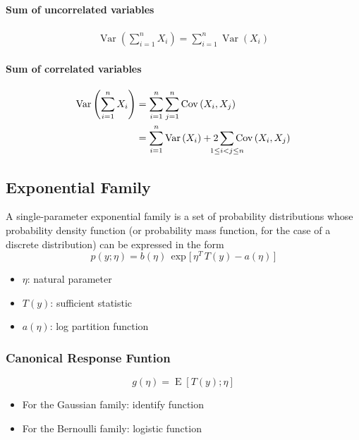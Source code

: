 \documentclass[8pt, a4paper, landscape, includeheadfoot]{extarticle}
\begin{document}
\begin{multicols*}{4}
	\paragraph{Sum of uncorrelated variables}

	\begin{align*}
		\operatorname{Var}\left(\sum_{i=1}^n X_i\right) = \sum_{i=1}^n \operatorname{Var}(X_i)
	\end{align*}

	\paragraph{Sum of correlated variables}
	\begin{align*}
		\operatorname{Var}\left(\sum_{i=1}^n X_i\right) & = \sum_{i=1}^n \sum_{j=1}^n \operatorname{Cov}\left(X_i, X_j\right)                                                                    \\
		                                                & = \sum_{i=1}^n \operatorname{Var}\left(X_i\right) + 2\hskip-10pt\sum_{1\le i<j\le n}\hskip-10pt\operatorname{Cov}\left(X_i, X_j\right)
	\end{align*}

	\subsection{Exponential Family}
	A single-parameter exponential family is a set of probability distributions
	whose probability density function (or probability mass function, for the case of a discrete distribution) can be expressed in the form
	$$
		p(y;\eta) = b(\eta)\,\exp\bigl[\,\eta^T \, T(y) - a(\eta)\,\bigr]
	$$
	\begin{itemize}[itemsep=0pt]
		\item $\eta$: natural parameter
		\item $T(y)$: sufficient statistic
		\item $a(\eta)$: log partition function
	\end{itemize}

	\subsubsection{Canonical Response Funtion}{}
	$$
		g(\eta) = \operatorname{E}[T(y);\eta]
	$$
	\begin{itemize}[itemsep=0pt]
		\item For the Gaussian family: identify function
		\item For the Bernoulli family: logistic function
	\end{itemize}


\end{multicols*}
\end{document}
